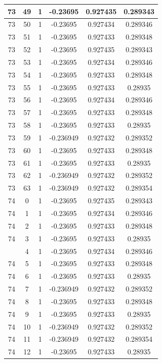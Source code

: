 \documentclass[12pt,a4paper]{article}
\numberwithin{equation}{section}
\numberwithin{figure}{section}
\numberwithin{table}{section}
\begin{document}
\begin{longtable}{|c|c|c|c|c|c|}
73 & 49 & 1 & -0.23695 & 0.927435 & 0.289343 \\ \hline
73 & 50 & 1 & -0.23695 & 0.927434 & 0.289346 \\ \hline
73 & 51 & 1 & -0.23695 & 0.927433 & 0.289348 \\ \hline
73 & 52 & 1 & -0.23695 & 0.927435 & 0.289343 \\ \hline
73 & 53 & 1 & -0.23695 & 0.927434 & 0.289346 \\ \hline
73 & 54 & 1 & -0.23695 & 0.927433 & 0.289348 \\ \hline
73 & 55 & 1 & -0.23695 & 0.927433 & 0.28935 \\ \hline
73 & 56 & 1 & -0.23695 & 0.927434 & 0.289346 \\ \hline
73 & 57 & 1 & -0.23695 & 0.927433 & 0.289348 \\ \hline
73 & 58 & 1 & -0.23695 & 0.927433 & 0.28935 \\ \hline
73 & 59 & 1 & -0.236949 & 0.927432 & 0.289352 \\ \hline
73 & 60 & 1 & -0.23695 & 0.927433 & 0.289348 \\ \hline
73 & 61 & 1 & -0.23695 & 0.927433 & 0.28935 \\ \hline
73 & 62 & 1 & -0.236949 & 0.927432 & 0.289352 \\ \hline
73 & 63 & 1 & -0.236949 & 0.927432 & 0.289354 \\ \hline
74 & 0 & 1 & -0.23695 & 0.927435 & 0.289343 \\ \hline
74 & 1 & 1 & -0.23695 & 0.927434 & 0.289346 \\ \hline
74 & 2 & 1 & -0.23695 & 0.927433 & 0.289348 \\ \hline
74 & 3 & 1 & -0.23695 & 0.927433 & 0.28935 \\ \hline
\pagebreak
74 & 4 & 1 & -0.23695 & 0.927434 & 0.289346 \\ \hline
74 & 5 & 1 & -0.23695 & 0.927433 & 0.289348 \\ \hline
74 & 6 & 1 & -0.23695 & 0.927433 & 0.28935 \\ \hline
74 & 7 & 1 & -0.236949 & 0.927432 & 0.289352 \\ \hline
74 & 8 & 1 & -0.23695 & 0.927433 & 0.289348 \\ \hline
74 & 9 & 1 & -0.23695 & 0.927433 & 0.28935 \\ \hline
74 & 10 & 1 & -0.236949 & 0.927432 & 0.289352 \\ \hline
74 & 11 & 1 & -0.236949 & 0.927432 & 0.289354 \\ \hline
74 & 12 & 1 & -0.23695 & 0.927433 & 0.28935 \\ \hline

\end{longtable}
\end{document}
